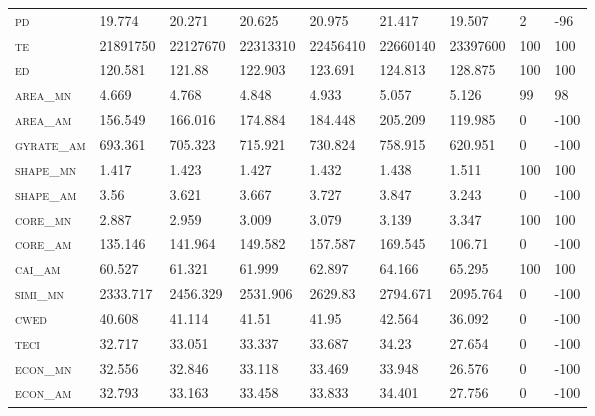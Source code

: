 \begin{landscape}
\begin{table}[!htbp]
\begin{tabular}{@{}llllll|lll@{}}
\small \textsc{pd}               & 19.774   & 20.271   & 20.625   & 20.975   & 21.417     & 19.507        & 2        & -96  \\
\small \textsc{te}               & 21891750 & 22127670 & 22313310 & 22456410 & 22660140   & 23397600      & 100      & 100  \\
\small \textsc{ed}               & 120.581  & 121.88   & 122.903  & 123.691  & 124.813    & 128.875       & 100      & 100  \\
\small \textsc{area\_mn}         & 4.669    & 4.768    & 4.848    & 4.933    & 5.057      & 5.126         & 99       & 98   \\
\small \textsc{area\_am}         & 156.549  & 166.016  & 174.884  & 184.448  & 205.209    & 119.985       & 0        & -100 \\
\small \textsc{gyrate\_am}       & 693.361  & 705.323  & 715.921  & 730.824  & 758.915    & 620.951       & 0        & -100 \\
\small \textsc{shape\_mn}        & 1.417    & 1.423    & 1.427    & 1.432    & 1.438      & 1.511         & 100      & 100  \\
\small \textsc{shape\_am}        & 3.56     & 3.621    & 3.667    & 3.727    & 3.847      & 3.243         & 0        & -100 \\
\small \textsc{core\_mn}         & 2.887    & 2.959    & 3.009    & 3.079    & 3.139      & 3.347         & 100      & 100  \\
\small \textsc{core\_am}         & 135.146  & 141.964  & 149.582  & 157.587  & 169.545    & 106.71        & 0        & -100 \\
\small \textsc{cai\_am}          & 60.527   & 61.321   & 61.999   & 62.897   & 64.166     & 65.295        & 100      & 100  \\
\small \textsc{simi\_mn}         & 2333.717 & 2456.329 & 2531.906 & 2629.83  & 2794.671   & 2095.764      & 0        & -100 \\
\small \textsc{cwed}             & 40.608   & 41.114   & 41.51    & 41.95    & 42.564     & 36.092        & 0        & -100 \\
\small \textsc{teci}             & 32.717   & 33.051   & 33.337   & 33.687   & 34.23      & 27.654        & 0        & -100 \\
\small \textsc{econ\_mn}         & 32.556   & 32.846   & 33.118   & 33.469   & 33.948     & 26.576        & 0        & -100 \\
\small \textsc{econ\_am}         & 32.793   & 33.163   & 33.458   & 33.833   & 34.401     & 27.756        & 0        & -100 \\

\end{tabular}
\end{table}
\end{landscape}

